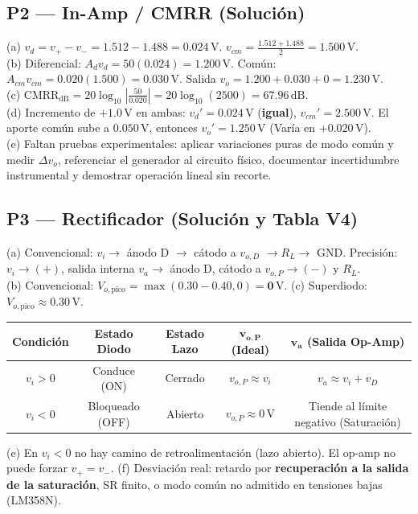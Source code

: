 \documentclass[10pt, a4paper]{article}
\begin{document}
\subsection*{P2 — In-Amp / CMRR (Solución)}
(a) $v_d = v_+ - v_- = 1.512 - 1.488 = \mathbf{0.024\,\mathrm{V}}$. $v_{cm} = \frac{1.512 + 1.488}{2} = \mathbf{1.500\,\mathrm{V}}$. \\
(b) Diferencial: $A_d v_d = 50(0.024) = \mathbf{1.200\,\mathrm{V}}$. Común: $A_{cm} v_{cm} = 0.020(1.500) = \mathbf{0.030\,\mathrm{V}}$. Salida $v_o = 1.200 + 0.030 + 0 = \mathbf{1.230\,\mathrm{V}}$. \\
(c) $\mathrm{CMRR}_{\mathrm{dB}} = 20\log_{10}\left|\frac{50}{0.020}\right| = 20\log_{10}(2500) = \mathbf{67.96\,\mathrm{dB}}$. \\
(d) Incremento de $+1.0\,\mathrm{V}$ en ambas: $v_d' = 0.024\,\mathrm{V}$ (\textbf{igual}), $v_{cm}' = 2.500\,\mathrm{V}$. El aporte común sube a $0.050\,\mathrm{V}$, entonces $v_o' = \mathbf{1.250\,\mathrm{V}}$ (Varía en $+0.020\,\mathrm{V}$). \\
(e) Faltan pruebas experimentales: aplicar variaciones puras de modo común y medir $\Delta v_o$, referenciar el generador al circuito físico, documentar incertidumbre instrumental y demostrar operación lineal sin recorte.

\subsection*{P3 — Rectificador (Solución y Tabla V4)}
(a) Convencional: $v_i \to$ ánodo D $\to$ cátodo a $v_{o,D}$ $\to R_L \to$ GND. Precisión: $v_i \to (+)$, salida interna $v_a \to$ ánodo D, cátodo a $v_{o,P} \to (-)$ y $R_L$. \\
(b) Convencional: $V_{o,\mathrm{pico}} = \max(0.30 - 0.40, 0) = \mathbf{0\,\mathrm{V}}$. (c) Superdiodo: $V_{o,\mathrm{pico}} \approx \mathbf{0.30\,\mathrm{V}}$.
\begin{center}
    \footnotesize
    \begin{tabular}{|c|c|c|c|c|}
    \hline
    \textbf{Condición} & \textbf{Estado Diodo} & \textbf{Estado Lazo} & $\mathbf{v_{o,P}}$ (Ideal) & $\mathbf{v_a}$ (Salida Op-Amp) \\ \hline
    $v_i > 0$ & Conduce (ON) & Cerrado & $v_{o,P} \approx v_i$ & $v_a \approx v_i + v_D$ \\ \hline
    $v_i < 0$ & Bloqueado (OFF) & Abierto & $v_{o,P} \approx 0\,\mathrm{V}$ & Tiende al límite negativo (Saturación) \\ \hline
    \end{tabular}
\end{center}
(e) En $v_i<0$ no hay camino de retroalimentación (lazo abierto). El op-amp no puede forzar $v_+ = v_-$. (f) Desviación real: retardo por \textbf{recuperación a la salida de la saturación}, SR finito, o modo común no admitido en tensiones bajas (LM358N).
\end{document}
